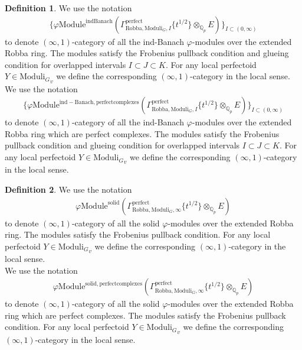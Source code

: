 \documentclass[12pt]{book}
\theoremstyle{definition}
\newtheorem{definition}{Definition}
\begin{document}
\begin{definition}
We use the notation
\begin{align}
\{\varphi\mathrm{Module}^{\mathrm{indBanach}}(\Gamma^\text{perfect}_{\text{Robba},{\mathrm{Moduli}_G},I}\{t^{1/2}\}\otimes_{\mathbb{Q}_p}E)\}_{I\subset (0,\infty)}
\end{align}
to denote $(\infty,1)$-category of all the ind-Banach $\varphi$-modules over the extended Robba ring. The modules satisfy the Frobenius pullback condition and glueing condition for overlapped intervals $I\subset J\subset K$. For any local perfectoid $Y\in {\mathrm{Moduli}_G}_v$ we define the corresponding $(\infty,1)$-category in the local sense.\\
We use the notation
\begin{align}
\{\varphi\mathrm{Module}^{\mathrm{ind-Banach,perfectcomplexes}}(\Gamma^\text{perfect}_{\text{Robba},{\mathrm{Moduli}_G},I}\{t^{1/2}\}\otimes_{\mathbb{Q}_p}E)\}_{I\subset (0,\infty)}
\end{align}
to denote $(\infty,1)$-category of all the ind-Banach $\varphi$-modules over the extended Robba ring which are perfect complexes. The modules satisfy the Frobenius pullback condition and glueing condition for overlapped intervals $I\subset J\subset K$. For any local perfectoid $Y\in {\mathrm{Moduli}_G}_v$ we define the corresponding $(\infty,1)$-category in the local sense. 

\end{definition}

\begin{definition}
We use the notation
\begin{align}
\varphi\mathrm{Module}^{\mathrm{solid}}(\Gamma^\text{perfect}_{\text{Robba},{\mathrm{Moduli}_G},\infty}\{t^{1/2}\}\otimes_{\mathbb{Q}_p}E)
\end{align}
to denote $(\infty,1)$-category of all the solid $\varphi$-modules over the extended Robba ring. The modules satisfy the Frobenius pullback condition. For any local perfectoid $Y\in {\mathrm{Moduli}_G}_v$ we define the corresponding $(\infty,1)$-category in the local sense.\\
We use the notation
\begin{align}
\varphi\mathrm{Module}^{\mathrm{solid,perfectcomplexes}}(\Gamma^\text{perfect}_{\text{Robba},{\mathrm{Moduli}_G},\infty}\{t^{1/2}\}\otimes_{\mathbb{Q}_p}E)
\end{align}
to denote $(\infty,1)$-category of all the solid $\varphi$-modules over the extended Robba ring which are perfect complexes. The modules satisfy the Frobenius pullback condition. For any local perfectoid $Y\in {\mathrm{Moduli}_G}_v$ we define the corresponding $(\infty,1)$-category in the local sense. 

\end{definition}
\end{document}
